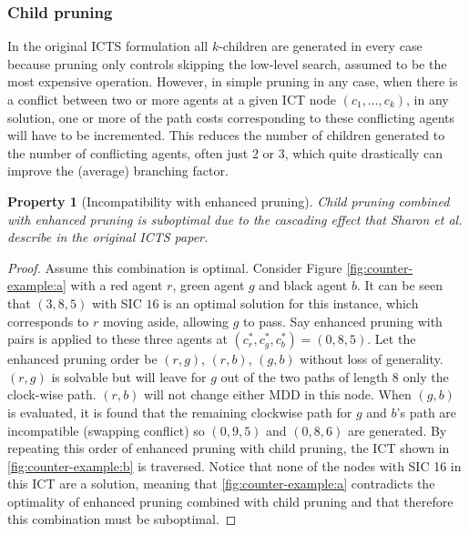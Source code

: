 \documentclass[english]{article}
\newtheorem{property}{Property}
\begin{document}
	\subsubsection{Child pruning}
	In the original ICTS formulation all $k$-children are generated in every case because pruning only controls skipping the low-level search, assumed to be the most expensive operation. However, in simple pruning in any case, when there is a conflict between two or more agents at a given ICT node $(c_1,\ldots,c_k)$, in any solution, one or more of the path costs corresponding to these conflicting agents will have to be incremented. This reduces the number of children generated to the number of conflicting agents, often just 2 or 3, which quite drastically can improve the (average) branching factor.
	\begin{property}[Incompatibility with enhanced pruning]
		Child pruning combined with enhanced pruning is suboptimal due to the \textit{cascading effect} that Sharon et al. describe in the original ICTS paper\cite{sharon2011}.
	\end{property}
	\begin{proof}
		Assume this combination is optimal. Consider Figure \ref{fig:counter-example:a} with a red agent $r$, green agent $g$ and black agent $b$. It can be seen that $(3,8,5)$ with SIC $16$ is an optimal solution for this instance, which corresponds to $r$ moving aside, allowing $g$ to pass.  Say enhanced pruning with pairs is applied to these three agents at $(c^*_r,c^*_g,c^*_b) = (0,8,5)$. Let the enhanced pruning order be $(r,g)$, $(r,b)$, $(g,b)$ without loss of generality. $(r,g)$ is solvable but will leave for $g$ out of the two paths of length $8$ only the clock-wise path. $(r,b)$ will not change either MDD in this node. When $(g,b)$ is evaluated, it is found that the remaining clockwise path for $g$ and $b$'s path are incompatible (swapping conflict) so $(0,9,5)$ and $(0,8,6)$ are generated. By repeating this order of enhanced pruning with child pruning, the ICT shown in \ref{fig:counter-example:b} is traversed. Notice that none of the nodes with SIC 16 in this ICT are a solution, meaning that \ref{fig:counter-example:a} contradicts the optimality of enhanced pruning combined with child pruning and that therefore this combination must be suboptimal.
	\end{proof}
	
\end{document}
